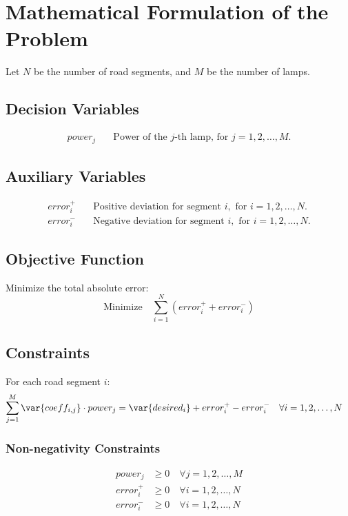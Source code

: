 \documentclass{article}
\begin{document}
\section*{Mathematical Formulation of the Problem}

Let \( N \) be the number of road segments, and \( M \) be the number of lamps.

\subsection*{Decision Variables}
\begin{align*}
power_j & \quad \text{Power of the } j\text{-th lamp, for } j = 1, 2, \ldots, M.
\end{align*}

\subsection*{Auxiliary Variables}
\begin{align*}
error_i^+ & \quad \text{Positive deviation for segment } i, \text{ for } i = 1, 2, \ldots, N. \\
error_i^- & \quad \text{Negative deviation for segment } i, \text{ for } i = 1, 2, \ldots, N.
\end{align*}

\subsection*{Objective Function}
Minimize the total absolute error:
\[
\text{Minimize} \quad \sum_{i=1}^{N} (error_i^+ + error_i^-)
\]

\subsection*{Constraints}
For each road segment \( i \):
\begin{align*}
\sum_{j=1}^{M} \var{coeff_{i,j}} \cdot power_j &= \var{desired_i} + error_i^+ - error_i^- \quad \forall i = 1, 2, \ldots, N 
\end{align*}

\subsubsection*{Non-negativity Constraints}
\begin{align*}
power_j & \geq 0 \quad \forall j = 1, 2, \ldots, M \\
error_i^+ & \geq 0 \quad \forall i = 1, 2, \ldots, N \\
error_i^- & \geq 0 \quad \forall i = 1, 2, \ldots, N 
\end{align*}
\end{document}
